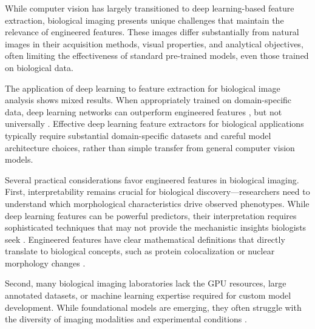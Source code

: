 \documentclass{article}
\begin{document}


While computer vision has largely transitioned to deep learning-based feature extraction, biological imaging presents unique challenges that maintain the relevance of engineered features. These images differ substantially from natural images in their acquisition methods, visual properties, and analytical objectives, often limiting the effectiveness of standard pre-trained models, even those trained on biological data.

The application of deep learning to feature extraction for biological image analysis shows mixed results.
When appropriately trained on domain-specific data, deep learning networks can outperform engineered features \cite{lafargeCapturingSingleCellPhenotypic2019,moshkovLearningRepresentationsImagebased2022,chowPredictingDrugPolypharmacology2022,wolfSCANPYLargescaleSinglecell2018}, but not universally \cite{tangMorphologicalProfilingDrug2024,kimSelfsupervisionAdvancesMorphological2023}. 
Effective deep learning feature extractors for biological applications typically require substantial domain-specific datasets and careful model architecture choices, rather than simple transfer from general computer vision models.

Several practical considerations favor engineered features in biological imaging. 
First, interpretability remains crucial for biological discovery—researchers need to understand which morphological characteristics drive observed phenotypes. 
While deep learning features can be powerful predictors, their interpretation requires sophisticated techniques that may not provide the mechanistic insights biologists seek \citep{liChallengesOpportunitiesBioimage2023}. 
Engineered features have clear mathematical definitions that directly translate to biological concepts, such as protein colocalization or nuclear morphology changes \cite{garcia-fossaInterpretingImagebasedProfiles2023}.

Second, many biological imaging laboratories lack the GPU resources, large annotated datasets, or machine learning expertise required for custom model development. While foundational models are emerging, they often struggle with the diversity of imaging modalities and experimental conditions \cite{azadFoundationalModelsMedical2023}.
\end{document}

